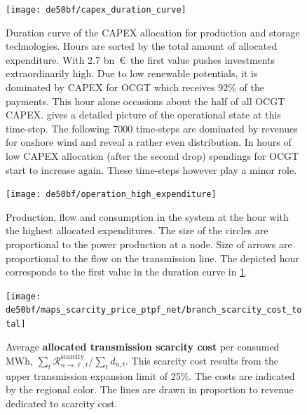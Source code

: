 \documentclass[11pt,twocolumn]{article}
\newcommand{\demand}[1][n]{d_{#1,t}}
\newcommand{\remainingcost}{\mathcal{R}}
\newcommand{\scarcitycost}{\remainingcost^\text{scarcity}}
\begin{document}
\begin{figure}
    \texttt{[image: de50bf/capex\_duration\_curve]}
    \caption{Duration curve of the CAPEX allocation for production and storage technologies. Hours are sorted by the total amount of allocated expenditure. With 2.7 bn~\euro\, the first value pushes investments extraordinarily high. Due to low renewable potentials, it is dominated by CAPEX for OCGT which receives 92\% of the payments. This hour alone occasions about the half of all OCGT CAPEX.  gives a detailed picture of the operational state at this time-step. The following 7000 time-steps are dominated by revenues for onshore wind and reveal a rather even distribution. In hours of low CAPEX allocation (after the second drop) spendings for OCGT start to increase again. These time-steps however play a minor role.}
    \label{fig:capex_duration_curve}
\end{figure}

\begin{figure}
    \texttt{[image: de50bf/operation\_high\_expenditure]}
    \caption{Production, flow and consumption in the system at the hour with the highest allocated expenditures. The size of the circles are proportional to the power production at a node. Size of arrows are proportional to the flow on the transmission line. The depicted hour corresponds to the first value in the duration curve in \cref{fig:capex_duration_curve}.}
    \label{fig:operation_high_expenditure}
\end{figure}


\begin{figure}
    \texttt{[image: de50bf/maps\_scarcity\_price\_ptpf\_net/branch\_scarcity\_cost\_total]}
    \caption{Average \textbf{allocated transmission scarcity cost} per consumed MWh, $\sum_t \scarcitycost_{n \rightarrow \ell, t} / \sum_t \demand $. This scarcity cost results from the upper transmission expansion limit of 25\%. The costs are indicated by the regional color.  The lines are drawn in proportion to revenue dedicated to scarcity cost. }
    \label{fig:branch_scarcity_price}
\end{figure}
\end{document}

